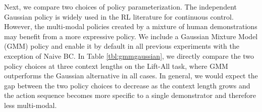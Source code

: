\begin{table}[h!]
\caption{\textbf{GMM vs. Gaussian on Lift-All}}
\label{tbl:gmmgaussian}
\end{table}

Next, we compare two choices of policy parameterization. The independent Gaussian policy is widely used in the RL literature for continuous control. However, the multi-modal policies created by a mixture of human demonstrations may benefit from a more expressive policy. We include a Gaussian Mixture Model (GMM) policy and enable it by default in all previous experiments with the exception of Naive BC. In Table \ref{tbl:gmmgaussian}, we directly compare the two policy choices at three context lengths on the Lift-All task, where GMM outperforms the Gaussian alternative in all cases. In general, we would expect the gap between the two policy choices to decrease as the context length grows and the action sequence becomes more specific to a single demonstrator and therefore less multi-modal. 



